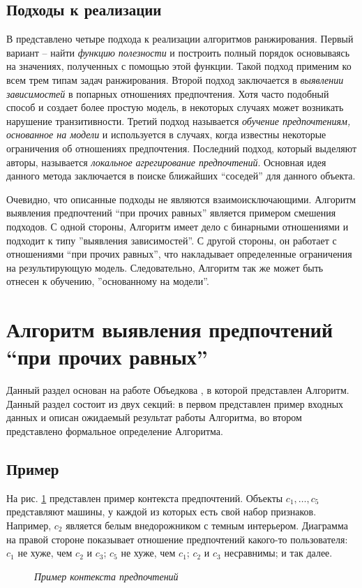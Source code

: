 	\subsection{Подходы к реализации}
		В \cite{plbook:Introduction:2010} представлено четыре подхода к реализации алгоритмов ранжирования. 
		Первый вариант – найти \emph{функцию полезности} и построить полный порядок основываясь на значениях, полученных с помощью этой функции. Такой подход применим ко всем трем типам задач ранжирования. 
		Второй подход заключается в \emph{выявлении зависимостей} в попарных отношениях предпочтения. Хотя часто подобный способ и создает более простую модель, в некоторых случаях может возникать нарушение транзитивности\cite[стр.~10]{plbook:Introduction:2010}. 
		Третий подход называется \emph{обучение предпочтениям, основанное на модели} и используется в случаях, когда известны некоторые ограничения об отношениях предпочтения. 
		Последний подход, который выделяют авторы, называется \emph{локальное агрегирование предпочтений}. Основная идея данного метода заключается в поиске ближайших \enquote{соседей} для данного объекта.
		
		Очевидно, что описанные подходы не являются взаимоисключающими. Алгоритм выявления предпочтений \enquote{при прочих равных} является примером смешения подходов. С одной стороны, Алгоритм имеет дело с бинарными отношениями и подходит к типу ''выявления зависимостей''. С другой стороны, он работает с отношениями \enquote{при прочих равных}, что накладывает определенные ограничения на результирующую модель. Следовательно, Алгоритм так же может быть отнесен к обучению, ''основанному на модели''.
	
	
\section{Алгоритм выявления предпочтений \enquote{при прочих равных}}

	Данный раздел основан на работе Объедкова \cite{Obiedkov:2013}, в которой представлен Алгоритм. Данный раздел состоит из двух секций: в первом представлен пример входных данных и описан ожидаемый результат работы Алгоритма, во втором представлено формальное определение Алгоритма.
	
	\subsection{Пример}
	\label{subsection:example}
		На рис. \ref{fig:pcxt} представлен пример контекста предпочтений. Объекты $c_1, \dots, c_5$ представляют машины, у каждой из которых есть свой набор признаков. Например, $c_2$ является белым внедорожником с темным интерьером. Диаграмма на правой стороне показывает отношение предпочтений какого-то пользователя: $c_1$ не хуже, чем $c_2$ и $c_3$; $c_5$ не хуже, чем $c_1$; $c_2$ и $c_3$ несравнимы; и так далее. 
		\begin{figure}
			\begin{center} 
				\cars \prefs
				\caption{\it Пример контекста предпочтений \cite[Рис.~1.1]{Obiedkov:2013}}
				\label{fig:pcxt}	
			\end{center} 
		\end{figure} 
		
